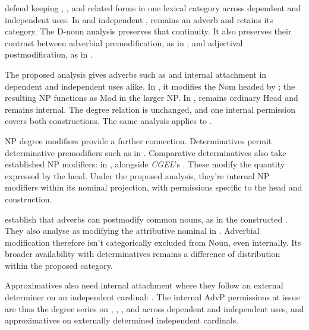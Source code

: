 \documentclass[12pt]{article}
\begin{document}
\textcite[40--42]{payne2010} defend keeping , , and related forms in one lexical category across dependent and independent uses. In  and independent ,  remains an adverb and  retains its category. The D-noun analysis preserves that continuity. It also preserves their contrast between adverbial premodification, as in , and adjectival postmodification, as in .

The proposed analysis gives adverbs such as  and  internal attachment in dependent and independent uses alike. In , it modifies the Nom headed by ; the resulting  NP functions as Mod in the larger NP. In ,  remains ordinary Head and  remains internal. The degree relation is unchanged, and one internal permission covers both constructions. The same analysis applies to .

NP degree modifiers provide a further connection. Determinatives permit determinative premodifiers such as  in  \citep[393]{huddleston2002}. Comparative determinatives also take established NP modifiers:  in , alongside \textit{CGEL}'s  \citep[432]{huddleston2002}. These modify the quantity expressed by the head. Under the proposed analysis, they're internal NP modifiers within its nominal projection, with permissions specific to the head and construction.

\textcite[42--47]{payne2010} establish that adverbs can postmodify common nouns, as in the constructed . They also analyse  as modifying the attributive nominal  in  \citep[p.~75, n.~3]{payne2010}. Adverbial modification therefore isn't categorically excluded from Noun, even internally. Its broader availability with determinatives remains a difference of distribution within the proposed category.

Approximatives also need internal attachment where they follow an external determiner on an independent cardinal: . The internal AdvP permissions at issue are thus the degree series on , , , and  across dependent and independent uses, and approximatives on externally determined independent cardinals.
\end{document}
